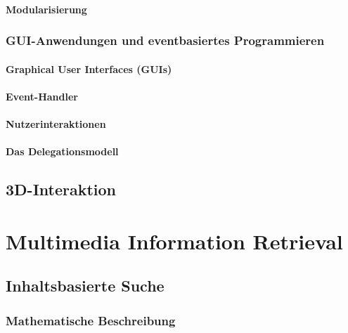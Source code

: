 \documentclass[a4paper, 11pt, accentcolor = tud3b]{tudreport}
\begin{document}
				\subsubsection{Modularisierung} %

			\subsection{GUI-Anwendungen und eventbasiertes Programmieren} %

				\subsubsection{Graphical User Interfaces (GUIs)} %

				\subsubsection{Event-Handler} %

				\subsubsection{Nutzerinteraktionen} %

				\subsubsection{Das Delegationsmodell} %

		\section{3D-Interaktion} %

	\chapter{Multimedia Information Retrieval} %

		\section{Inhaltsbasierte Suche} %

			\subsection{Mathematische Beschreibung} %
\end{document}
